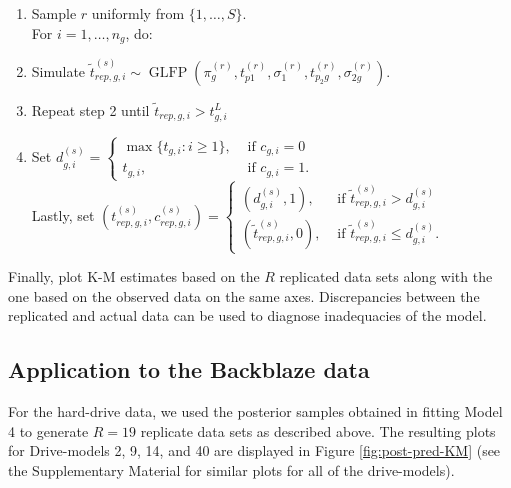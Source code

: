 \documentclass[11pt]{article}
\newcommand{\op}{\operatorname}
\begin{document}
\begin{enumerate}
\item Sample $r$ uniformly from $\{1,\ldots,S\}$.\\ For $i=1,\ldots,n_g$, do:
\item Simulate $\tilde{t}_{rep,g,i}^{(s)} \sim \op{GLFP}(\pi_{g}^{(r)},t_{p1}^{(r)},\sigma_1^{(r)},t_{p_{2}g}^{(r)}, \sigma_{2g}^{(r)}).$
\item Repeat step 2 until $\tilde{t}_{rep,g,i} > t_{g,i}^L$
\item Set $d_{g,i}^{(s)}= \begin{cases} \max \{t_{g,i}: i \ge 1\}, & \mbox{ if }c_{g,i}=0\\
t_{g,i}, & \mbox{ if }c_{g, i}=1. \end{cases}$\\
Lastly, set $(t_{rep,g,i}^{(s)},c_{rep,g,i}^{(s)}) = \begin{cases}
  (d_{g,i}^{(s)},1), & \mbox{ if } \tilde{t}_{rep,g,i}^{(s)}>d_{g,i}^{(s)}\\
  (\tilde{t}_{rep,g,i}^{(s)},0), & \mbox{ if }\tilde{t}_{rep,g,i}^{(s)} \le d_{g,i}^{(s)}.
\end{cases}$
\end{enumerate}
Finally, plot K-M estimates based on the $R$ replicated data sets along with the one based on the observed data on the same axes. Discrepancies between the replicated and actual data can be used to diagnose inadequacies of the model.

\subsection{Application to the Backblaze data}
For the hard-drive data, we used the posterior samples obtained in fitting Model 4 to generate $R=19$ replicate data sets as described above. The resulting plots for Drive-models 2, 9, 14, and 40 are displayed in Figure \ref{fig:post-pred-KM} (see the Supplementary Material for similar plots for all of the drive-models).
\end{document}
